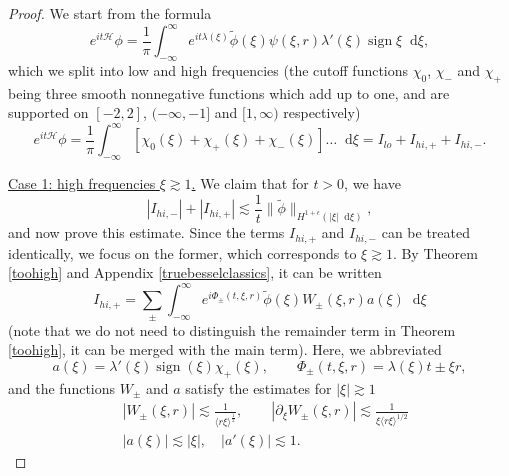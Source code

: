 \documentclass[11 pt]{amsart}
\theoremstyle{definition}
\theoremstyle{remark}
\numberwithin{equation}{section}
\newcommand{\dd}{\mathop{}\!\mathrm{d}}
\begin{document}
\begin{proof} 
We start from the formula
$$
e^{it \mathcal{H}} \phi = \frac{1}{\pi} \int_{-\infty}^\infty e^{it \lambda(\xi)}   \widetilde{\phi} (\xi) \psi(\xi,r) \lambda'(\xi) \operatorname{sign} \xi \dd \xi,
$$
which we split into low and high frequencies (the cutoff functions 
$\chi_0$, $\chi_-$ and $\chi_+$ being three smooth nonnegative functions which add up to one, and are supported on $[-2,2]$, $(-\infty,-1]$ and $[1,\infty)$ respectively)
$$
e^{it \mathcal{H}} \phi = \frac{1}{\pi} \int_{-\infty}^\infty [ \chi_{0} (\xi) + \chi_{+}(\xi) + \chi_{-}(\xi) ] \dots \dd \xi = I_{lo} + I_{hi,+} + I_{hi,-}.
$$

\medskip

\noindent
\underline{Case 1: high frequencies $\xi \gtrsim 1$.} We claim that for $t>0$, we have
$$
|I_{hi,-}|+|I_{hi,+}|\lesssim \frac{1}{t} \| \widetilde{\phi}\|_{H^{1+\epsilon}(|\xi|\dd \xi)},
$$
and now prove this estimate. Since the terms $I_{hi,+}$ and $I_{hi,-}$ can be treated identically, we focus on the former, which corresponds to $\xi \gtrsim 1$. 
By Theorem \ref{toohigh} and Appendix \ref{truebesselclassics}, it can be written
\begin{equation}
\label{constable}
I_{hi,+} = \sum_{\pm} \int_{-\infty}^\infty e^{i \Phi_{\pm}(t,\xi,r)}   \widetilde{\phi} (\xi) W_{\pm}(\xi,r) a(\xi) \dd \xi %
\end{equation}
(note that we do not need to distinguish the remainder term in Theorem \ref{toohigh}, it can be merged with the main term). Here, we abbreviated
$$
a(\xi) = \lambda'(\xi) \operatorname{sign}(\xi) \chi_{+}(\xi), \qquad \Phi_{\pm}(t,\xi,r) = \lambda(\xi) t \pm \xi r,
$$
and the functions $W_{\pm}$ and $a$ satisfy the estimates for $|\xi| \gtrsim 1$
\begin{equation}
\label{estimateWa}
\begin{split}
& |W_{\pm}(\xi,r) | \lesssim \frac{1}{\langle r \xi \rangle^{\frac{1}{2}}}, 
\qquad |\partial_\xi W_{\pm}(\xi,r) | \lesssim \frac{1}{\xi \langle r\xi \rangle^{1/2}}  \\
& |a(\xi)| \lesssim |\xi|, \quad |a'(\xi)| \lesssim 1 .
\end{split}
\end{equation}


\end{proof}
\end{document}
